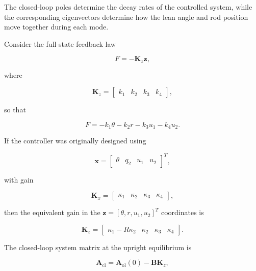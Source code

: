 The closed-loop poles determine the decay rates of the controlled system, while the corresponding eigenvectors determine how the lean angle and rod position move together during each mode.

Consider the full-state feedback law

\begin{equation}
F
=
-\mathbf{K}_{z}\mathbf{z},
\end{equation}

where

\begin{equation}
\mathbf{K}_{z}
=
\begin{bmatrix}
k_1 & k_2 & k_3 & k_4
\end{bmatrix},
\end{equation}

so that

\begin{equation}
F
=
-k_1\theta
-k_2r
-k_3u_1
-k_4u_2.
\label{eq:closed-loop-physical-feedback}
\end{equation}

If the controller was originally designed using

\begin{equation}
\mathbf{x}
=
\begin{bmatrix}
\theta &
q_2 &
u_1 &
u_2
\end{bmatrix}^{T},
\end{equation}

with gain

\begin{equation}
\mathbf{K}_{x}
=
\begin{bmatrix}
\kappa_1 &
\kappa_2 &
\kappa_3 &
\kappa_4
\end{bmatrix},
\end{equation}

then the equivalent gain in the
$\mathbf{z}=[\theta,r,u_1,u_2]^T$ coordinates is

\begin{equation}
\mathbf{K}_{z}
=
\begin{bmatrix}
\kappa_1-R\kappa_2 &
\kappa_2 &
\kappa_3 &
\kappa_4
\end{bmatrix}.
\label{eq:closed-loop-gain-transformation}
\end{equation}

The closed-loop system matrix at the upright equilibrium is

\begin{equation}
\mathbf{A}_{\mathrm{cl}}
=
\mathbf{A}_{\mathrm{ol}}(0)
-
\mathbf{B}\mathbf{K}_{z},
\end{equation}

